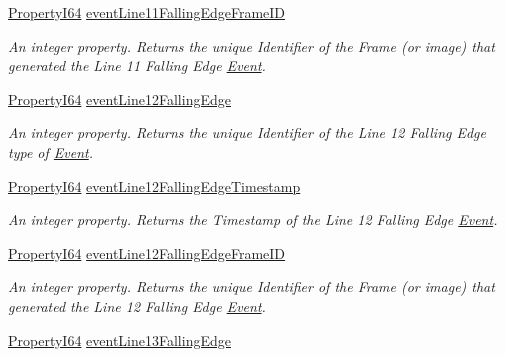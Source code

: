 \begin{DoxyCompactItemize}
\hyperlink{group___common_interface_ga81749b2696755513663492664a18a893}{Property\+I64} \hyperlink{classmv_i_m_p_a_c_t_1_1acquire_1_1_gen_i_cam_1_1_event_control_a8840700c93170ceca36a181bcdfc9fa3}{event\+Line11\+Falling\+Edge\+Frame\+I\+D}
\begin{DoxyCompactList}\small\item\em An integer property. Returns the unique Identifier of the Frame (or image) that generated the Line 11 Falling Edge \hyperlink{classmv_i_m_p_a_c_t_1_1acquire_1_1_event}{Event}. \end{DoxyCompactList}\item 
\hyperlink{group___common_interface_ga81749b2696755513663492664a18a893}{Property\+I64} \hyperlink{classmv_i_m_p_a_c_t_1_1acquire_1_1_gen_i_cam_1_1_event_control_a9320d4c7153df0c9e76a989bd07f9cbb}{event\+Line12\+Falling\+Edge}
\begin{DoxyCompactList}\small\item\em An integer property. Returns the unique Identifier of the Line 12 Falling Edge type of \hyperlink{classmv_i_m_p_a_c_t_1_1acquire_1_1_event}{Event}. \end{DoxyCompactList}\item 
\hyperlink{group___common_interface_ga81749b2696755513663492664a18a893}{Property\+I64} \hyperlink{classmv_i_m_p_a_c_t_1_1acquire_1_1_gen_i_cam_1_1_event_control_aa153eb7b1964b2d9a55e38f3ef7fc544}{event\+Line12\+Falling\+Edge\+Timestamp}
\begin{DoxyCompactList}\small\item\em An integer property. Returns the Timestamp of the Line 12 Falling Edge \hyperlink{classmv_i_m_p_a_c_t_1_1acquire_1_1_event}{Event}. \end{DoxyCompactList}\item 
\hyperlink{group___common_interface_ga81749b2696755513663492664a18a893}{Property\+I64} \hyperlink{classmv_i_m_p_a_c_t_1_1acquire_1_1_gen_i_cam_1_1_event_control_a9ef022abcc1fd9dc653b8a9f2f5795c7}{event\+Line12\+Falling\+Edge\+Frame\+I\+D}
\begin{DoxyCompactList}\small\item\em An integer property. Returns the unique Identifier of the Frame (or image) that generated the Line 12 Falling Edge \hyperlink{classmv_i_m_p_a_c_t_1_1acquire_1_1_event}{Event}. \end{DoxyCompactList}\item 
\hyperlink{group___common_interface_ga81749b2696755513663492664a18a893}{Property\+I64} \hyperlink{classmv_i_m_p_a_c_t_1_1acquire_1_1_gen_i_cam_1_1_event_control_a96af8b7f0e7c024747c416b03c4b88e9}{event\+Line13\+Falling\+Edge}

\end{DoxyCompactItemize}
